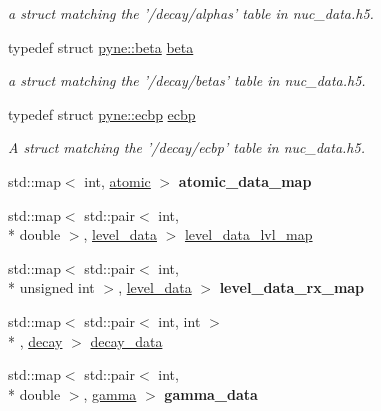 \begin{DoxyCompactItemize}
\begin{DoxyCompactList}\small\item\em a struct matching the '/decay/alphas' table in nuc\-\_\-data.\-h5. \end{DoxyCompactList}\item 
\hypertarget{namespacepyne_ae80bdf847bfa789021a5dafc132772e1}{typedef struct \hyperlink{structpyne_1_1beta}{pyne\-::beta} \hyperlink{namespacepyne_ae80bdf847bfa789021a5dafc132772e1}{beta}}\label{namespacepyne_ae80bdf847bfa789021a5dafc132772e1}

\begin{DoxyCompactList}\small\item\em a struct matching the '/decay/betas' table in nuc\-\_\-data.\-h5. \end{DoxyCompactList}\item 
\hypertarget{namespacepyne_a172aa77622d272744ca413d8e1f89735}{typedef struct \hyperlink{structpyne_1_1ecbp}{pyne\-::ecbp} \hyperlink{namespacepyne_a172aa77622d272744ca413d8e1f89735}{ecbp}}\label{namespacepyne_a172aa77622d272744ca413d8e1f89735}

\begin{DoxyCompactList}\small\item\em A struct matching the '/decay/ecbp' table in nuc\-\_\-data.\-h5. \end{DoxyCompactList}\item 
\hypertarget{namespacepyne_ac53d31be0627daff52e6f9b4afc13ab5}{std\-::map$<$ int, \hyperlink{structpyne_1_1atomic}{atomic} $>$ {\bfseries atomic\-\_\-data\-\_\-map}}\label{namespacepyne_ac53d31be0627daff52e6f9b4afc13ab5}

\item 
std\-::map$<$ std\-::pair$<$ int, \\*
double $>$, \hyperlink{structpyne_1_1level__data}{level\-\_\-data} $>$ \hyperlink{namespacepyne_aa5b6136e3970959756640b867754bb62}{level\-\_\-data\-\_\-lvl\-\_\-map}
\item 
\hypertarget{namespacepyne_ae1858b7f76aa7faa5c758f6a42332202}{std\-::map$<$ std\-::pair$<$ int, \\*
unsigned int $>$, \hyperlink{structpyne_1_1level__data}{level\-\_\-data} $>$ {\bfseries level\-\_\-data\-\_\-rx\-\_\-map}}\label{namespacepyne_ae1858b7f76aa7faa5c758f6a42332202}

\item 
std\-::map$<$ std\-::pair$<$ int, int $>$\\*
, \hyperlink{structpyne_1_1decay}{decay} $>$ \hyperlink{namespacepyne_ac880c3701eca3453cb9cdfab30195d65}{decay\-\_\-data}
\item 
\hypertarget{namespacepyne_a590557e517e261616148c1643e72ddb2}{std\-::map$<$ std\-::pair$<$ int, \\*
double $>$, \hyperlink{structpyne_1_1gamma}{gamma} $>$ {\bfseries gamma\-\_\-data}}\label{namespacepyne_a590557e517e261616148c1643e72ddb2}


\end{DoxyCompactItemize}

